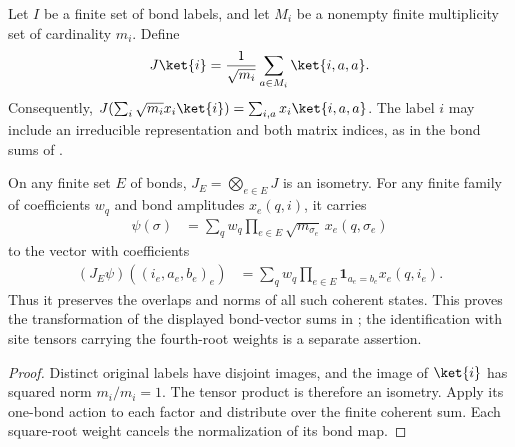 \begin{definition}%
    \label{def:peps_multiplicity_bond_coefficients}
    \leanok
    Let $I$ be a finite set of bond labels, and let $M_i$ be a nonempty
    finite multiplicity set of cardinality $m_i$. Define
    \begin{align}
        J\ket{i}=\frac{1}{\sqrt{m_i}}
        \sum_{a\in M_i}\ket{i,a,a}.
    \end{align}
    Consequently, $J(\sum_i\sqrt{m_i}x_i\ket{i})
        =\sum_{i,a}x_i\ket{i,a,a}$. The label $i$ may include an irreducible
    representation and both matrix indices, as in the bond sums of
    \cite[Section~7]{Schuch2010PEPS}.
\end{definition}

\begin{lemma}%
    \label{thm:peps_multiplicity_bond_coherent_states}
    \leanok
    On any finite set $E$ of bonds, $J_E=\bigotimes_{e\in E}J$ is an
    isometry. For any finite family of coefficients $w_q$ and bond
    amplitudes $x_e(q,i)$, it carries
    \begin{align}
        \psi(\sigma) & =\sum_q w_q\prod_{e\in E}
        \sqrt{m_{\sigma_e}}\,x_e(q,\sigma_e)
    \end{align}
    to the vector with coefficients
    \begin{align}
        (J_E\psi)((i_e,a_e,b_e)_e)
         & =\sum_q w_q\prod_{e\in E}
        \mathbf{1}_{a_e=b_e}x_e(q,i_e).
    \end{align}
    Thus it preserves the overlaps and norms of all such coherent states.
    This proves the transformation of the displayed bond-vector sums in
    \cite[Section~7]{Schuch2010PEPS}; the identification with site tensors
    carrying the fourth-root weights is a separate assertion.
\end{lemma}

\begin{proof}\leanok
    Distinct original labels have disjoint images, and the image of
    $\ket{i}$ has squared norm $m_i/m_i=1$. The tensor product is
    therefore an isometry. Apply its one-bond action to each factor and
    distribute over the finite coherent sum. Each square-root weight
    cancels the normalization of its bond map.
\end{proof}
